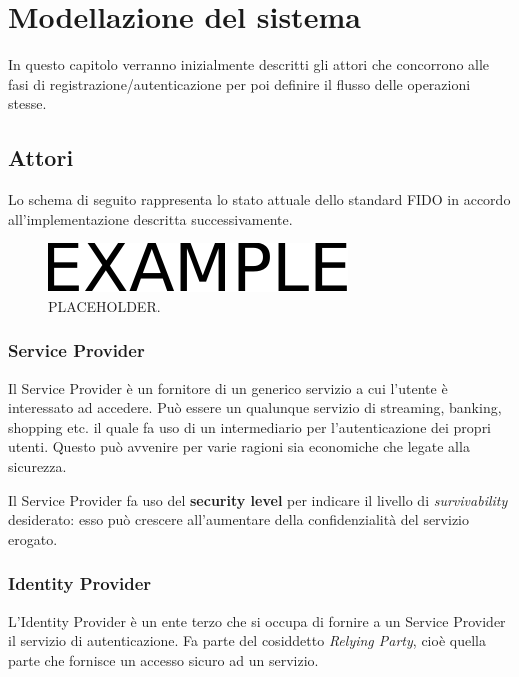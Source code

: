 \chapter{Modellazione del sistema}
\label{modellazione}

In questo capitolo verranno inizialmente descritti gli attori che concorrono alle fasi di registrazione/autenticazione per poi definire il flusso delle operazioni stesse.

\section{Attori}
\label{attori}

Lo schema di seguito rappresenta lo stato attuale dello standard FIDO in accordo all'implementazione descritta successivamente.
\begin{figure}[htb]
	\centering
	\includegraphics[width=.4\columnwidth]{figures/example.pdf}
	\caption{PLACEHOLDER.}
	\label{fig:esempio}
\end{figure}

\subsection{Service Provider}
\label{service_provider}

Il Service Provider è un fornitore di un generico servizio a cui l'utente è interessato ad accedere. Può essere un qualunque servizio di streaming, banking, shopping etc. il quale fa uso di un intermediario per l'autenticazione dei propri utenti. Questo può avvenire per varie ragioni sia economiche che legate alla sicurezza. 

Il Service Provider fa uso del \textbf{security level} per indicare il livello di \emph{survivability} desiderato: esso può crescere all'aumentare della confidenzialità del servizio erogato.

\subsection{Identity Provider}
\label{identity_provider}

L'Identity Provider è un ente terzo che si occupa di fornire a un Service Provider il servizio di autenticazione. Fa parte del cosiddetto \emph{Relying Party}, cioè quella parte che fornisce un accesso sicuro ad un servizio. 

